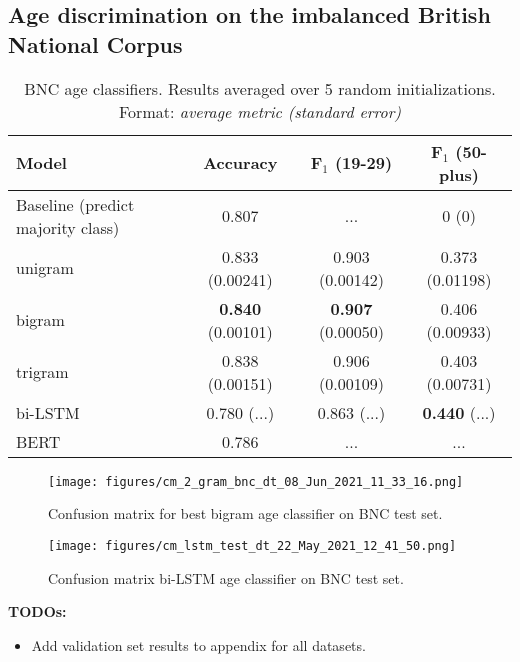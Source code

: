 \subsection{Age discrimination on the imbalanced British National Corpus}
\label{age_disc_bnc}

\begin{table}[H]
    \centering
    \begin{tabular}{l c c c}
    \hline
    \textbf{Model} & \textbf{Accuracy} & $\boldsymbol{F}_1$ (19-29) & $\boldsymbol{F}_1$ (50-plus)\\
    \hline
    Baseline (predict majority class) & 0.807 & ... & 0 (0)\\
    unigram & 0.833 (0.00241) & 0.903 (0.00142) & 0.373 (0.01198)\\
    bigram & \textbf{0.840} (0.00101) & \textbf{0.907} (0.00050) & 0.406 (0.00933)\\
    trigram & 0.838 (0.00151) & 0.906 (0.00109) & 0.403 (0.00731)\\
    bi-LSTM & 0.780 (...) & 0.863 (...) & \textbf{0.440} (...)\\
    BERT & 0.786 & ... & ...\\
    \hline
    \end{tabular}
    \caption{BNC age classifiers. Results averaged over 5 random initializations. Format: \textit{average metric (standard error)}}
    \label{tab:bnc_classification}
\end{table}

\begin{figure}[H]
    \centering
    \texttt{[image: figures/cm\_2\_gram\_bnc\_dt\_08\_Jun\_2021\_11\_33\_16.png]}
    \caption{Confusion matrix for best bigram age classifier on BNC test set.}
    \label{fig:cm_bigram_bnc}
\end{figure}

\begin{figure}[H]
    \centering
    \texttt{[image: figures/cm\_lstm\_test\_dt\_22\_May\_2021\_12\_41\_50.png]}
    \caption{Confusion matrix bi-LSTM age classifier on BNC test set.}
    \label{fig:cm_lstm_bnc}
\end{figure}

\textbf{TODOs:}
\begin{itemize}
    \item Add validation set results to appendix for all datasets.
\end{itemize}